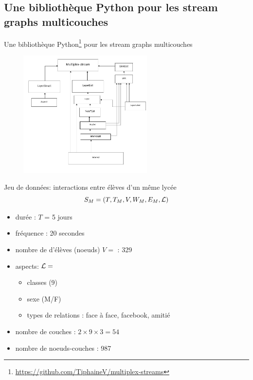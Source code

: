 \documentclass[15pt]{beamer}
\def \stgms {stream graphs multicouches}
\begin{document}
\subsection{Une bibliothèque Python pour les \stgms{}}


\begin{frame}{Une bibliothèque Python\footnote{\url{https://github.com/TiphaineV/multiplex-streams}} pour les \stgms{}}
    \begin{figure}
        \centering
        \includegraphics[width=0.6\textwidth]{img/codeStructure.JPG}
        \label{fig:my_label}
    \end{figure}
\end{frame}

\begin{frame}{Jeu de données: interactions entre élèves d'un même lycée}
    $$S_M=(T,T_M,V,W_M,E_M,{\cal L})$$
    \begin{itemize}
        \item durée : $T$ = 5 jours
        \item fréquence : 20 secondes
        \item nombre de d'élèves (noeuds) $V=$ : 329
        \item aspects: ${\cal L} =$ \begin{itemize}
            \item classes (9)
            \item sexe (M/F)
            \item types de relations : face à face, facebook, amitié
        \end{itemize}
        \item nombre de couches : $2\times 9 \times 3 = 54$
        \item nombre de noeuds-couches : 987
    \end{itemize}
\end{frame}
\end{document}
